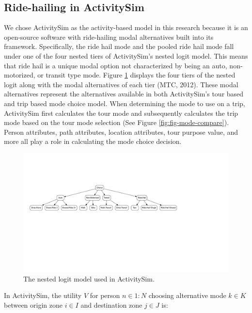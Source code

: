 \documentclass[fancy, masters]{byuthesis}
\begin{document}
\hypertarget{ride-hailing-in-activitysim}{%
\subsection{Ride-hailing in ActivitySim}\label{ride-hailing-in-activitysim}}

We chose ActivitySim as the activity-based model in this research because it is an open-source software with ride-hailing modal alternatives built into its framework. Specifically, the ride hail mode and the pooled ride hail mode fall under one of the four nested tiers of ActivitySim's nested logit model. This means that ride hail is a unique modal option not characterized by being an auto, non-motorized, or transit type mode. Figure \ref{fig:fig-asim-nest} displays the four tiers of the nested logit along with the modal alternatives of each tier (MTC, 2012). These modal alternatives represent the alternatives available in both ActivitySim's tour based and trip based mode choice model. When determining the mode to use on a trip, ActivitySim first calculates the tour mode and subsequently calculates the trip mode based on the tour mode selection (See Figure \ref{fig:fig-mode-compare}). Person attributes, path attributes, location attributes, tour purpose value, and more all play a role in calculating the mode choice decision.

\begin{figure}

{\centering \includegraphics[width=.7\textwidth,trim = {5cm 6.5cm 12.5cm 4cm}]{thesis_files/figure-latex/fig-asim-nest-1} 

}

\caption{The nested logit model used in ActivitySim.}\label{fig:fig-asim-nest}
\end{figure}

In ActivitySim, the utility \(V\) for person \(n \in {1:N}\) choosing alternative mode \(k \in K\) between origin zone \(i \in I\) and destination zone \(j \in J\) is:
\end{document}
